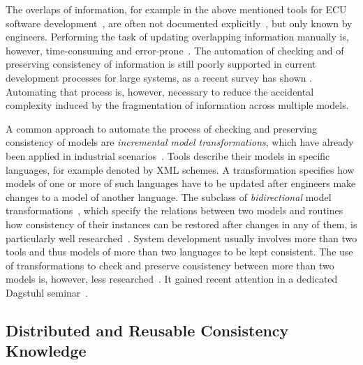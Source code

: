 The overlaps of information, for example in the above mentioned tools for \gls{ECU} software development~\cite{giese2010a}, are often not documented explicitly~\cite{mazkatli2017ase}, but only known by engineers.
Performing the task of updating overlapping information manually is, however, time-consuming and error-prone~.
The automation of checking and of preserving consistency of information is still poorly supported in current development processes for large systems, as a recent survey has shown .
Automating that process is, however, necessary to reduce the accidental complexity induced by the fragmentation of information across multiple models.

A common approach to automate the process of checking and preserving consistency of models are \emph{incremental model transformations}, which have already been applied in industrial scenarios~\cite{giese2009incrementalModelSynchronization-SoSym, giese2010a}.
Tools describe their models in specific languages, for example denoted by \gls{XML} schemes. %
A transformation specifies how models of one or more of such languages have to be updated after engineers make changes to a model of another language.
The subclass of \emph{bidirectional} model transformations~\cite{stevens2010sosym}, which specify the relations between two models and routines how consistency of their instances can be restored after changes in any of them, is particularly well researched~\cite{cleve2019dagstuhl,kahani2018SurveyTransformationTools-SoSym}.
System development usually involves more than two tools and thus models of more than two languages to be kept consistent.
The use of transformations to check and preserve consistency between more than two models is, however, less researched~\cite{stevens2020BidirectionalTransformationLarge-SoSym}.
It gained recent attention in a dedicated Dagstuhl seminar~\cite{cleve2019dagstuhl}.


\subsection{Distributed and Reusable Consistency Knowledge} %

